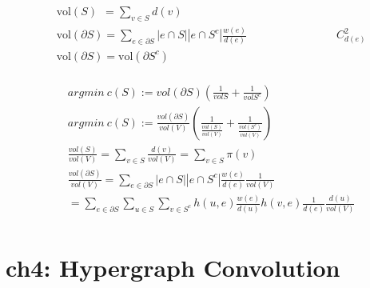 \documentclass{article}
\begin{document}
%
\begin{align*}
    & \text{vol}(S) \ \ = \sum_{v \in S} d(v)  \\[3pt]
    & \text{vol}(\partial S) = \sum_{e \in \partial S} 
      |e \cap S||e \cap S^{c}| \frac{w(e)}{d(e)} 
      \qquad \qquad \qquad \qquad C_{d(e)}^{2}  \\[3pt]
    & \text{vol}(\partial S) = \text{vol}(\partial S^{c})  \\[3pt]
\end{align*}


%
\begin{align*}
    & argmin \ c(S) := vol(\partial S) (\frac{1}{volS} + \frac{1}{volS^{c}})  \\[3pt]
    & argmin \ c(S) := \frac{vol(\partial S)}{vol(V)} 
    (\frac{1}{ \frac{vol(S)}{vol(V)} } + 
     \frac{1}{ \frac{vol(S^{c})}{vol(V)} })  \\[3pt]
    & \frac{vol(S)}{vol(V)} 
      = \sum_{v \in S} \frac{d(v)}{vol(V)} 
      = \sum_{v \in S} \pi (v)  \\[3pt]
    & \frac{vol(\partial S)}{vol(V)} = \sum_{e \in \partial S} 
      |e \cap S||e \cap S^{c}| \frac{w(e)}{d (e)} 
      \frac{1}{vol(V)}  \\[3pt]
    & = \sum_{e \in \partial S} \sum_{u \in S} \sum_{v \in S^{c}} 
        h(u, e) \frac{w(e)}{d(u)} h(v, e) \frac{1}{d(e)} 
        \frac{d(u)}{vol(V)}  \\[3pt]
\end{align*}


\newpage
\section*{ch4: Hypergraph Convolution}
\end{document}
